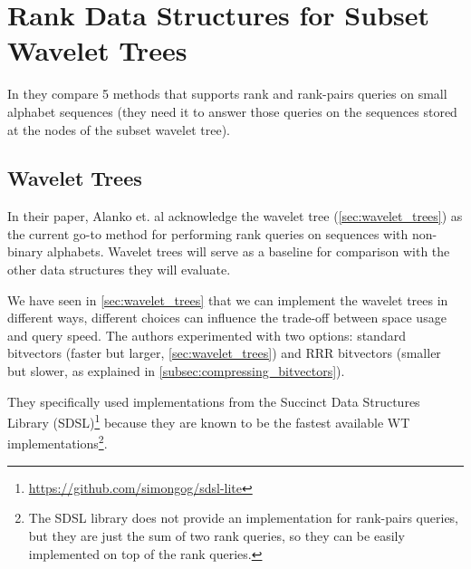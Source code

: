 \section{Rank Data Structures for Subset Wavelet Trees} \label{sec:rank_succint_datastructures}
In \cite{SubsetWT} they compare 5 methods that supports rank and rank-pairs queries on small alphabet sequences (they need it to answer those queries on the sequences stored at the nodes of the subset wavelet tree).

\subsection{Wavelet Trees}

In their paper, Alanko et. al acknowledge the wavelet tree (\autoref{sec:wavelet_trees}) as the current go-to method for performing rank queries on sequences with non-binary alphabets. Wavelet trees will serve as a baseline for comparison with the other data structures they will evaluate. \vspace{0.4cm}

\noindent We have seen in \autoref{sec:wavelet_trees} that we can implement the wavelet trees in different ways, different choices can influence the trade-off between space usage and query speed. The authors experimented with two options: standard bitvectors (faster but larger, \autoref{sec:wavelet_trees}) and RRR bitvectors (smaller but slower, as explained in \autoref{subsec:compressing_bitvectors}). \vspace{0.4cm}

\noindent They specifically used implementations from the Succinct Data Structures Library (SDSL)\footnote{\url{https://github.com/simongog/sdsl-lite}} because they are known to be the fastest available WT implementations\footnote{The SDSL library does not provide an implementation for rank-pairs queries, but they are just the sum of two rank queries, so they can be easily implemented on top of the rank queries.}. \vspace{0.4cm}

 \vspace{0.4cm}


